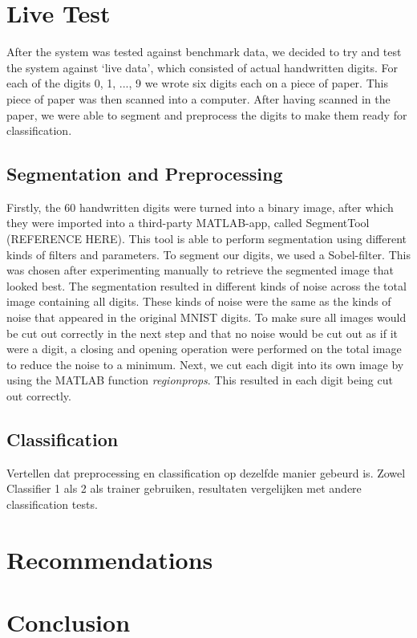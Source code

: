 \documentclass[11pt,twoside,a4paper]{article}
\begin{document}
\section{Live Test}
After the system was tested against benchmark data, we decided to try and test the system against `live data', which consisted of actual handwritten digits. For each of the digits 0, 1, ..., 9 we wrote six digits each on a piece of paper. This piece of paper was then scanned into a computer. After having scanned in the paper, we were able to segment and preprocess the digits to make them ready for classification.

\subsection{Segmentation and Preprocessing}
Firstly, the 60 handwritten digits were turned into a binary image, after which they were imported into a third-party MATLAB-app, called SegmentTool (REFERENCE HERE). This tool is able to perform segmentation using different kinds of filters and parameters. To segment our digits, we used a Sobel-filter. This was chosen after experimenting manually to retrieve the segmented image that looked best.\newline
\newline
The segmentation resulted in different kinds of noise across the total image containing all digits. These kinds of noise were the same as the kinds of noise that appeared in the original MNIST digits. To make sure all images would be cut out correctly in the next step and that no noise would be cut out as if it were a digit, a closing and opening operation were performed on the total image to reduce the noise to a minimum. Next, we cut each digit into its own image by using the MATLAB function \emph{regionprops}. This resulted in each digit being cut out correctly.


\subsection{Classification}
Vertellen dat preprocessing en classification op dezelfde manier gebeurd is.
Zowel Classifier 1 als 2 als trainer gebruiken, resultaten vergelijken met andere classification tests.

\section{Recommendations}

\section{Conclusion}
\end{document}
